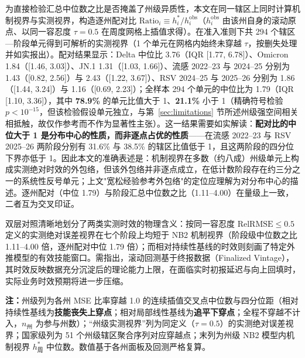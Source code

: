 \documentclass[11pt,a4paper]{article}
\theoremstyle{plain}
\theoremstyle{definition}
\begin{document}
为直接检验汇总中位数之比是否掩盖了州级异质性，本文在同一辖区上同时计算机制视界与实测视界，构造逐州配对比 $\text{Ratio}_i \equiv h^{*}_i / h^{\text{obs}}_i$（$h^{\text{obs}}_i$ 由该州自身的滚动原点、以同一容忍度 $\tau=0.5$ 在周度网格上插值求得）。在准入准则下共 294 个辖区—阶段单元得到可解析的实测视界（1 个单元在网格内始终未穿越 $\tau$，按删失处理并如实报出）。配对结果显示：Delta 中位比 3.76（IQR [1.77, 6.78]）、Omicron 1.84（[1.46, 3.03]）、JN.1 1.31（[1.03, 1.66]）、流感 2022--23 与 2024--25 分别为 1.43（[0.82, 2.56]）与 2.43（[1.22, 3.67]）、RSV 2024--25 与 2025--26 分别为 1.86（[1.44, 3.24]）与 1.16（[0.69, 2.23]）；全样本 294 个单元的中位比为 1.79（IQR [1.10, 3.36]），其中 \textbf{78.9\%} 的单元比值大于 1、\textbf{21.1\%} 小于 1（精确符号检验 $p < 10^{-15}$，但该检验假设单元独立，与第~\ref{sec:limitations} 节所述州级强空间相关相抵触，故仅作参考而不作为显著性主张）。这一结果需要如实解读：\textbf{配对比的中位大于 1 是分布中心的性质，而非逐点占优的性质}——在流感 2022--23 与 RSV 2025--26 两阶段分别有 31.6\% 与 38.5\% 的辖区比值低于 1，且这两阶段的四分位下界亦低于 1。因此本文的准确表述是：机制视界在多数（约八成）州级单元上构成实测绝对时效的外包络，但该外包络并非逐点成立，在低计数阶段存在约三分之一的系统性反号单元；上文"宽松经验参考外包络"的定位应理解为对分布中心的描述。逐州配对（中位 1.79）与阶段汇总中位数之比（1.11--4.00）在量级上一致，二者互为交叉印证。

双层对照清晰地划分了两类实测时效的物理含义：按同一容忍度 $\text{RelRMSE} \le 0.5$ 定义的实测绝对误差视界在七个阶段上均短于 NB2 机制视界（阶段级中位数之比 1.11--4.00 倍，逐州配对中位 1.79 倍）；而相对持续性基线的时效则刻画了特定外推模型的有效技能窗口。需指出，滚动回测基于终报数据（Finalized Vintage），其时效反映数据充分沉淀后的理论能力上限，在面临实时初报延迟与向上回填时，实际业务时效预期将进一步压缩。

\begin{table}[htbp]
\centering
\footnotesize
\caption{NB2 模型内机制视界与伪实时滚动业务时效的州级双层对照}
\label{tab:rolling}
\setlength{\tabcolsep}{1.5pt}%
%
\vspace{2pt}
\begin{flushleft}
\scriptsize \textbf{注：}州级列为各州 MSE 比率穿越 1.0 的连续插值交叉点中位数与四分位距（相对持续性基线为\textbf{技能丧失上穿点}；相对局部线性基线为\textbf{追平下穿点}；全程不穿越不计入，$n_{\text{州}}$ 为参与州数）；``州级实测视界''列为同定义（$\tau=0.5$）的实测绝对误差视界；国家级列为 51 个州级辖区聚合序列对应穿越点；末列为州级 NB2 模型内机制视界 $h^*_{\text{周}}$ 中位数。数值基于各州面板及回测严格复算。\end{flushleft}
\end{table}
\end{document}
